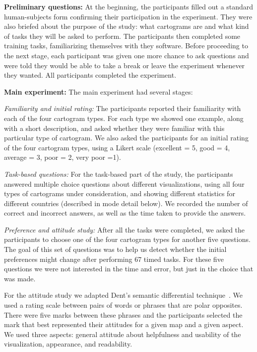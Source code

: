 \documentclass[10pt,journal,compsoc]{IEEEtran}
\begin{document}
\medskip
\noindent
\textbf{Preliminary questions:}
At the beginning, the participants filled out a standard human-subjects form confirming their participation in the experiment. They were also briefed about the purpose of the study: what cartograms are and what kind of tasks they will be asked to perform. The participants then completed some training tasks, familiarizing themselves with they software. 
Before proceeding to the next stage, each participant was given one more chance to ask questions and   were  told they would be able to take a break or leave the experiment whenever they wanted. All participants completed the experiment.

\medskip
\noindent
\textbf{Main experiment:} The main experiment had several stages:


\textit{Familiarity and initial rating:}
The participants reported their familiarity with each of the four cartogram types. For each type we showed   one example, along with a short description, and asked whether they were familiar with this particular type of cartogram.
We also asked the participants for an initial rating of the four cartogram types, using a Likert scale (excellent = 5, good = 4, average = 3, poor = 2, very poor =1).


\textit{Task-based questions:} 
For the task-based part of the study, the participants answered multiple choice questions about different visualizations, using all four types of cartograms under consideration, and showing different statistics for different countries (described in mode detail below). We recorded the number of correct and incorrect answers, as well as the time taken to provide the answers.

\textit{Preference and attitude study:} 
After all the tasks were completed, we asked the participants to choose one of the four cartogram types for another five questions. The goal of this set of questions was to help us detect whether the initial preferences might change after performing 67 timed tasks. For these five questions we were not interested in the time and error, but just in the choice that was made.


For the attitude study we adapted Dent's semantic differential technique~\cite{dent1975}. We used a rating scale between pairs of words or phrases that are polar opposites. There were five marks between these phrases and the participants selected the mark 
that best represented their attitudes for a given map and a given aspect. We used three aspects: general attitude about helpfulness and usability of the visualization, appearance, and readability. 
\end{document}
